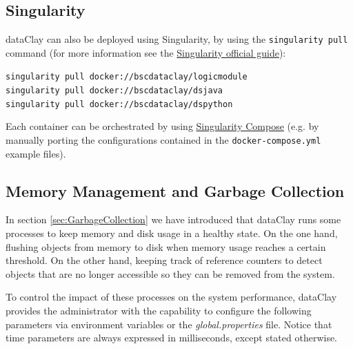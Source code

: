 \subsection{Singularity}
dataClay can also be deployed using Singularity, by using the \texttt{singularity pull} command (for more information see the \href{https://sylabs.io/guides/3.0/user-guide/build_a_container.html#downloading-an-existing-container-from-docker-hub}{Singularity official guide}): 

\texttt{singularity pull docker://bscdataclay/logicmodule}\\
\texttt{singularity pull docker://bscdataclay/dsjava}\\
\texttt{singularity pull docker://bscdataclay/dspython}

Each container can be orchestrated by using \href{https://singularityhub.github.io/singularity-compose}{Singularity Compose} (e.g. by manually porting the configurations contained in the \texttt{docker-compose.yml} example files).

\subsection{Memory Management and Garbage Collection}

In section \ref{sec:GarbageCollection} we have introduced that dataClay runs some processes to keep memory and disk usage in a healthy state. On the one hand, flushing objects from memory to disk when memory usage reaches a certain threshold. On the other hand, keeping track of reference counters to detect objects that are no longer accessible so they can be removed from the system.

To control the impact of these processes on the system performance, dataClay provides the administrator with the capability to configure the following parameters via environment variables or the \textit{global.properties} file. Notice that time parameters are always expressed in milliseconds, except stated otherwise.

